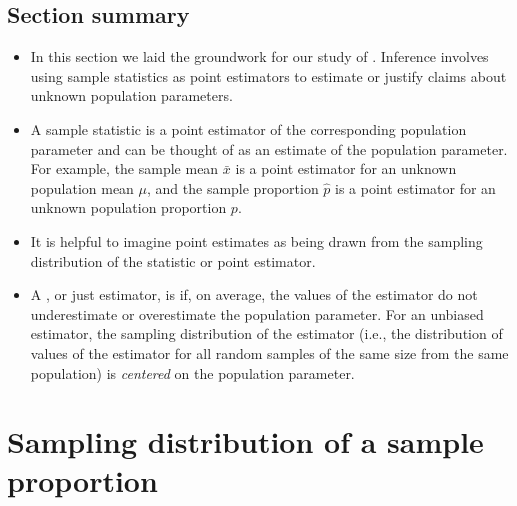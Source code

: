\D{\newpage}

\subsection*{Section summary}
\begin{itemize}
\item In this section we laid the groundwork for our study of .  Inference involves using sample statistics as point estimators to estimate or justify claims about unknown population parameters.

\item A sample statistic is a point estimator of the corresponding population
parameter and can be thought of as an estimate of the population parameter.
For example, the sample mean $\bar{x}$ is a point estimator for an unknown population mean $\mu$, and the sample proportion $\hat{p}$ is a point estimator for an unknown population proportion $p$.

\item It is helpful to imagine point estimates as being drawn from the sampling distribution of the statistic or point estimator.  

\item A , or just estimator, is  if, on average, the values of the estimator do not underestimate or overestimate the population parameter.  For an unbiased estimator, the sampling distribution of the estimator (i.e., the distribution of values of the estimator for all random samples of the same size from the same population) is \textit{centered} on the population parameter.  


\end{itemize}


{}



\section[Sampling distribution of a sample proportion]{Sampling distribution of a sample proportion}
\label{distributionphat}

